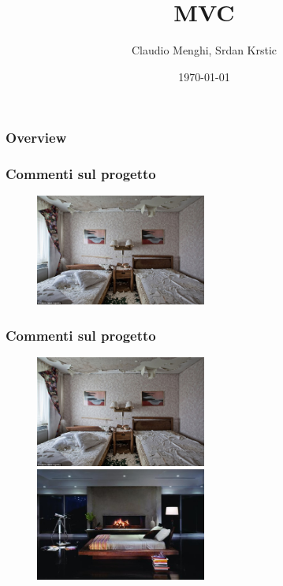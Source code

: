 \documentclass{beamer}
\title[Introduzione]{MVC} %
\author{Claudio Menghi,  Srdan Krstic} %
\institute[Deepse group] %
{
Politecnico di Milano \\ %
\medskip
\textit{menghi@elet.polimi.it,  srdan.krstic@polimi.it} %
}
\date{\today} %
\begin{document}
\begin{frame}
\titlepage %
\end{frame}

\begin{frame}
\frametitle{Overview} %
\tableofcontents %
\end{frame}


\begin{frame}
\frametitle{Commenti sul progetto}
\begin{figure}
\centering
\includegraphics[width=0.5\textwidth]{Img/OrribleBedroom.jpg}
\end{figure}
\end{frame}

\begin{frame}
\frametitle{Commenti sul progetto}
\begin{figure}
\centering
\includegraphics[width=0.5\textwidth]{Img/OrribleBedroom.jpg}
\includegraphics[width=0.5\textwidth]{Img/beedroom2.jpg}
\end{figure}
\end{frame}
\end{document}

